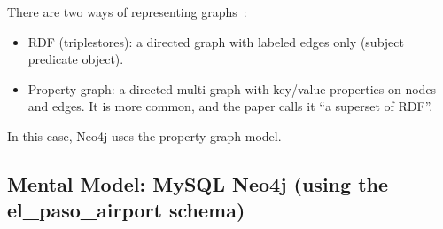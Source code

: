 \documentclass[11pt,a4paper]{article}
\begin{document}
There are two ways of representing graphs~\cite{stonebraker2024whatgoesaround}:

\begin{itemize}
  \item RDF (triplestores): a directed graph with labeled edges only (subject \textrightarrow{} predicate \textrightarrow{} object).
  \item Property graph: a directed multi-graph with key/value properties on nodes and edges. It is more common, and the paper calls it ``a superset of RDF''.
\end{itemize}

In this case, Neo4j uses the property graph model.

\subsection{Mental Model: MySQL \textrightarrow{} Neo4j (using the el\_paso\_airport schema)}
\end{document}

